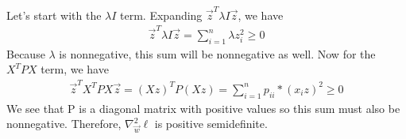 \documentclass[11pt]{article}
\begin{document}
\begin{enumerate}[(1)]
		\newline
		\newline
		Let's start with the $\lambda I$ term. Expanding $\vec{z}^T\lambda I\vec z$, we have 
		\begin{align*}
		\vec{z}^T\lambda I\vec z = \sum\limits_{i=1}^n \lambda z_i^2 \geq 0
		\end{align*}
		Because $\lambda$ is nonnegative, this sum will be nonnegative as well. Now for the $X^TPX$ term, we have
		\begin{align*}
		\vec{z}^TX^TPX\vec z = (Xz)^TP(Xz)
		= \sum\limits_{i=1}^n p_{ii} * (x_{i}z)^2 \geq 0
		\end{align*}
		\newline
		We see that P is a diagonal matrix with positive values so this sum must also be nonnegative.
		Therefore, $\nabla^2_{\vec{w}} \ell$ is positive semidefinite.
	\end{enumerate}
	
	
	
\end{document}
